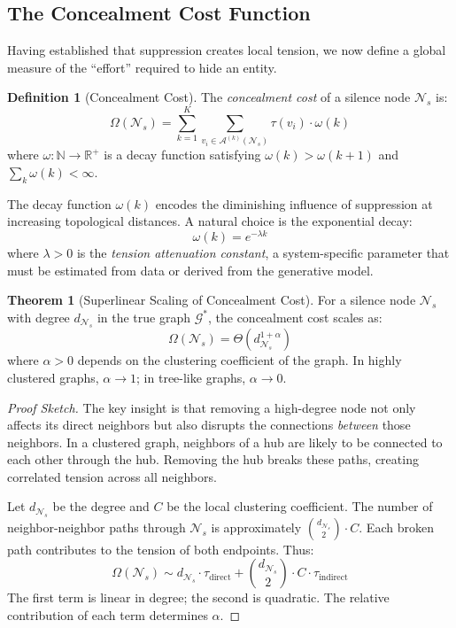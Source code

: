 \documentclass[12pt,a4paper]{article}
\theoremstyle{definition}
\newtheorem{definition}{Definition}[section]
\newtheorem{theorem}{Theorem}[section]
\theoremstyle{remark}
\newcommand{\NS}{\mathcal{N}_s}          %
\newcommand{\CA}{\mathcal{A}}            %
\newcommand{\CO}{\Omega}                  %
\newcommand{\Real}{\mathbb{R}}           %
\newcommand{\Graph}{\mathcal{G}}         %
\begin{document}
\subsection{The Concealment Cost Function}

Having established that suppression creates local tension, we now define a global measure of the ``effort'' required to hide an entity.

\begin{definition}[Concealment Cost]
The \emph{concealment cost} of a silence node $\NS$ is:
\begin{equation}
    \boxed{
    \CO(\NS) = \sum_{k=1}^{K} \sum_{v_i \in \CA^{(k)}(\NS)} \tau(v_i) \cdot \omega(k)
    }
    \label{eq:concealment}
\end{equation}
where $\omega: \mathbb{N} \to \Real^+$ is a decay function satisfying $\omega(k) > \omega(k+1)$ and $\sum_k \omega(k) < \infty$.
\end{definition}

The decay function $\omega(k)$ encodes the diminishing influence of suppression at increasing topological distances. A natural choice is the exponential decay:
\begin{equation}
    \omega(k) = e^{-\lambda k}
\end{equation}
where $\lambda > 0$ is the \emph{tension attenuation constant}, a system-specific parameter that must be estimated from data or derived from the generative model.

\begin{theorem}[Superlinear Scaling of Concealment Cost]
\label{thm:scaling}
For a silence node $\NS$ with degree $d_{\NS}$ in the true graph $\Graph^*$, the concealment cost scales as:
\begin{equation}
    \CO(\NS) = \Theta\left( d_{\NS}^{1+\alpha} \right)
\end{equation}
where $\alpha > 0$ depends on the clustering coefficient of the graph. In highly clustered graphs, $\alpha \to 1$; in tree-like graphs, $\alpha \to 0$.
\end{theorem}

\begin{proof}[Proof Sketch]
The key insight is that removing a high-degree node not only affects its direct neighbors but also disrupts the connections \emph{between} those neighbors. In a clustered graph, neighbors of a hub are likely to be connected to each other through the hub. Removing the hub breaks these paths, creating correlated tension across all neighbors.

Let $d_{\NS}$ be the degree and $C$ be the local clustering coefficient. The number of neighbor-neighbor paths through $\NS$ is approximately $\binom{d_{\NS}}{2} \cdot C$. Each broken path contributes to the tension of both endpoints. Thus:
\begin{equation}
    \CO(\NS) \sim d_{\NS} \cdot \tau_{\text{direct}} + \binom{d_{\NS}}{2} \cdot C \cdot \tau_{\text{indirect}}
\end{equation}
The first term is linear in degree; the second is quadratic. The relative contribution of each term determines $\alpha$.
\end{proof}
\end{document}
